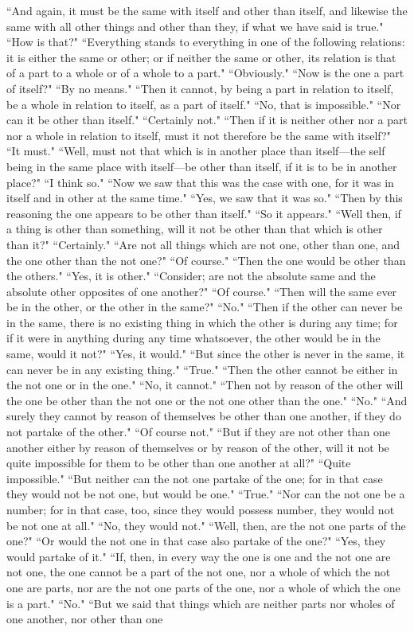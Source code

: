 \documentclass[letterpaper,12pt]{article}
\newcommand{\stephpag}[1]{\marginnote{\small\itshape\fontfamily{ppl}\selectfont #1}}
\begin{document}
``And again, it must be the same with itself and other than itself, \stephpag{b} and likewise the same with all other things and other than they, if what we have said is true." ``How is that?" ``Everything stands to everything in one of the following relations: it is either the same or other; or if neither the same or other, its relation is that of a part to a whole or of a whole to a part." ``Obviously." ``Now is the one a part of itself?" ``By no means." ``Then it cannot, by being a part in relation to itself, be a whole in relation to itself, as a part of itself." ``No, that is impossible." ``Nor can it be other than itself." \stephpag{c} ``Certainly not." ``Then if it is neither other nor a part nor a whole in relation to itself, must it not therefore be the same with itself?" ``It must." ``Well, must not that which is in another place than itself—the self being in the same place with itself—be other than itself, if it is to be in another place?" ``I think so." ``Now we saw that this was the case with one, for it was in itself and in other at the same time." ``Yes, we saw that it was so." ``Then by this reasoning the one appears to be other than itself." \stephpag{d} ``So it appears." ``Well then, if a thing is other than something, will it not be other than that which is other than it?" ``Certainly." ``Are not all things which are not one, other than one, and the one other than the not one?" ``Of course." ``Then the one would be other than the others." ``Yes, it is other." ``Consider; are not the absolute same and the absolute other opposites of one another?" ``Of course." ``Then will the same ever be in the other, or the other in the same?" ``No." ``Then if the other can never be in the same, there is no existing thing \stephpag{e} in which the other is during any time; for if it were in anything during any time whatsoever, the other would be in the same, would it not?" ``Yes, it would." ``But since the other is never in the same, it can never be in any existing thing." ``True." ``Then the other cannot be either in the not one or in the one." ``No, it cannot." ``Then not by reason of the other will the one be other than the not one or the not one other than the one." ``No." ``And surely they cannot by reason of themselves be other than one another, if they do not partake of the other." \stephpag{147 a} ``Of course not." ``But if they are not other than one another either by reason of themselves or by reason of the other, will it not be quite impossible for them to be other than one another at all?" ``Quite impossible." ``But neither can the not one partake of the one; for in that case they would not be not one, but would be one." ``True." ``Nor can the not one be a number; for in that case, too, since they would possess number, they would not be not one at all." ``No, they would not." ``Well, then, are the not one parts of the one?" ``Or would the not one in that case also partake of the one?" ``Yes, they would partake of it." \stephpag{b} ``If, then, in every way the one is one and the not one are not one, the one cannot be a part of the not one, nor a whole of which the not one are parts, nor are the not one parts of the one, nor a whole of which the one is a part." ``No." ``But we said that things which are neither parts nor wholes of one another, nor other than one 
\end{document}
